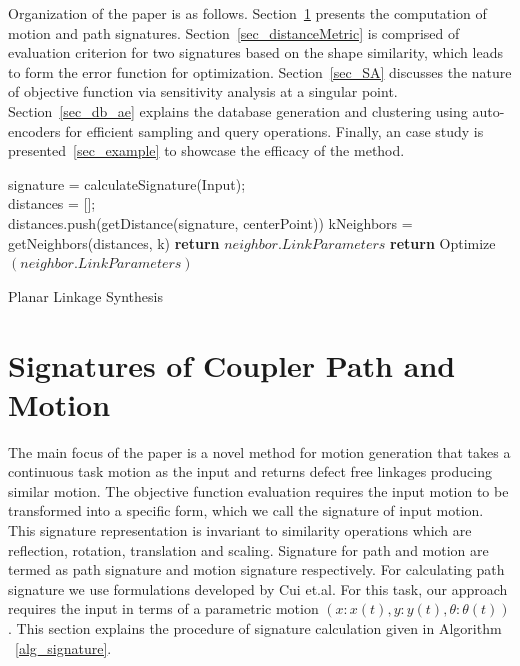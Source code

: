 \documentclass[twocolumn,10pt]{asme2e}
\begin{document}
Organization of the paper is as follows. Section~\ref{sec_sign} presents the computation of motion and path signatures.
Section~\ref{sec_distanceMetric} is comprised of evaluation criterion for two signatures based on the shape similarity, which leads to form the error function for optimization.
Section~\ref{sec_SA} discusses the nature of objective function via sensitivity analysis at a singular point.
Section~\ref{sec_db_ae} explains the database generation and clustering using auto-encoders for efficient sampling and query operations.
Finally, an case study is presented~\ref{sec_example} to showcase the efficacy of the method.

\begin{algorithm}
    signature = calculateSignature(Input); \\
    distances = [];\\
    {
      distances.push(getDistance(signature, centerPoint))
    }
    kNeighbors = getNeighbors(distances, k)
    {
      {
        \textbf{return} $neighbor.LinkParameters$
      }
      {
        \textbf{return} Optimize$(neighbor.LinkParameters)$
      }
    }
    \caption{Planar Linkage Synthesis}
    \label{alg_overall}
\end{algorithm}

\section{Signatures of Coupler Path and Motion}\label{sec_sign}
The main focus of the paper is a novel method for motion generation that takes a continuous task motion as the input and returns defect free linkages producing similar motion.
The objective function evaluation requires the input motion to be transformed into a specific form, which we call the signature of input motion.
This signature representation is invariant to similarity operations which are reflection, rotation, translation and scaling.
Signature for path and motion are termed as path signature and motion signature respectively.
For calculating path signature we use formulations developed by Cui et.al\cite{cui2009}.
For this task, our approach requires the input in terms of a parametric motion $(x:x(t), y:y(t), \theta:\theta(t))$.
This section explains the procedure of signature calculation given in Algorithm ~\ref{alg_signature}.
\end{document}
